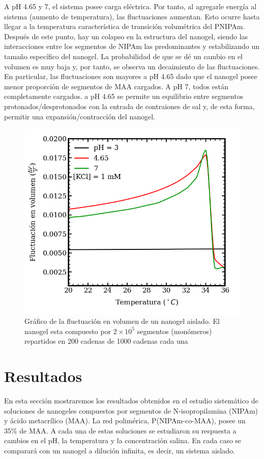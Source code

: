 	A pH 4.65 y 7, el sistema posee carga el\'ectrica. Por tanto, al agregarle energ\'ia al sistema (aumento de temperatura), las fluctuaciones aumentan. Esto ocurre hasta llegar a la temperatura caracter\'istica de transici\'on volum\'etrica del PNIPAm. Despu\'es de este punto, hay un colapso en la estructura del nanogel, siendo las interacciones entre los segmentos de NIPAm las predominantes y estabilizando un tama\~no espec\'ifico del nanogel.
	La probabilidad de que se d\'e un cambio en el volumen es muy baja y, por tanto, se observa un decaimiento de las fluctuaciones.
	En particular, las fluctuaciones son mayores a pH 4.65 dado que el nanogel posee menor proporci\'on de segmentos de MAA cargados. A pH 7, todos est\'an completamente cargados. a pH 4.65 se permite un equilibrio entre segmentos protonados/desprotonados con la entrada de contraiones de sal y, de esta forma, permitir una expansi\'on/contracci\'on del nanogel.
	
	
	
	\begin{figure}
		\centering
		\includegraphics[width=0.45\linewidth]{Figures/graph-mc/fluct-T.png}
		\caption{Gr\'afico de la fluctuaci\'on en volumen de un nanogel aislado. El nanogel esta compuesto por $2\times 10^5$ segmentos (mon\'omeros) repartidos en 200 cadenas de 1000 cadenas cada una}
		\label{fig:mc:fluct-T}
	\end{figure}
	
	
	\section{Resultados}
	
	En esta secci\'on mostraremos los resultados obtenidos en el estudio sistem\'atico de soluciones de nanogeles compuestos por segmentos de N-isopropilamina (NIPAm) y \'acido metacr\'ilico (MAA). La red polim\'erica, P(NIPAm-co-MAA), posee un 35\% de MAA.
	A cada una de estas soluciones se estudiaron su respuesta a cambios en el pH, la temperatura y la concentraci\'on salina. En cada caso se comparar\'a con un nanogel a diluci\'on infinita, es decir, un sistema aislado.
	
